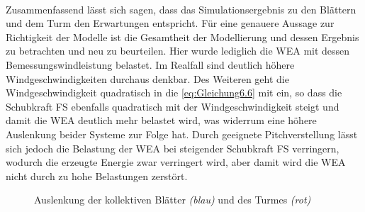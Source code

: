 \\
Zusammenfassend lässt sich sagen, dass das Simulationsergebnis zu den Blättern und dem Turm den Erwartungen entspricht. Für eine genauere Aussage zur Richtigkeit der Modelle ist die Gesamtheit der Modellierung und dessen Ergebnis zu betrachten und neu zu beurteilen. Hier wurde lediglich die WEA mit dessen Bemessungswindleistung belastet. Im Realfall sind deutlich höhere Windgeschwindigkeiten durchaus denkbar. Des Weiteren geht die Windgeschwindigkeit quadratisch in die \autoref{eq:Gleichung6.6} mit ein, so dass die Schubkraft \acs{FS} ebenfalls quadratisch mit der Windgeschwindigkeit steigt und damit die WEA deutlich mehr belastet wird, was widerrum eine höhere Auslenkung beider Systeme zur Folge hat. Durch geeignete Pitchverstellung lässt sich jedoch die Belastung der WEA bei steigender Schubkraft \acs{FS} verringern, wodurch die erzeugte Energie zwar verringert wird, aber damit wird die WEA nicht durch zu hohe Belastungen zerstört. 

 \begin{figure}[H]
    \centering
    \caption[Turm- und Blattauslenkung]{Auslenkung der kollektiven Blätter \textit{(blau)} und des Turmes \textit{(rot)}}
    \label{fig:Bild6.4}
\end{figure}

 
 
 